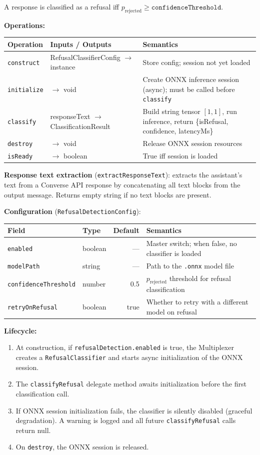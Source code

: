 \documentclass[10pt,letterpaper]{article}
\newcommand{\cls}[1]{\texttt{#1}}
\newcommand{\fn}[1]{\texttt{#1}}
\newcommand{\fld}[1]{\texttt{#1}}
\begin{document}
\medskip
\noindent A response is classified as a refusal iff $p_{\text{rejected}} \ge \fld{confidenceThreshold}$.

\medskip
\noindent\textbf{Operations:}

\smallskip
\begin{tabular}{@{}l l p{6.5cm}@{}}
\toprule
\textbf{Operation} & \textbf{Inputs / Outputs} & \textbf{Semantics} \\
\midrule
\fn{construct} & RefusalClassifierConfig $\to$ instance & Store config; session not yet loaded \\
\fn{initialize} & $\to$ void & Create ONNX inference session (async); must be called before \fn{classify} \\
\fn{classify} & responseText $\to$ ClassificationResult & Build string tensor $[1, 1]$, run inference, return \{isRefusal, confidence, latencyMs\} \\
\fn{destroy} & $\to$ void & Release ONNX session resources \\
\fn{isReady} & $\to$ boolean & True iff session is loaded \\
\bottomrule
\end{tabular}

\medskip
\noindent\textbf{Response text extraction} (\fn{extractResponseText}): extracts the assistant's text from a Converse API response by concatenating all text blocks from the output message. Returns empty string if no text blocks are present.

\medskip
\noindent\textbf{Configuration} (\cls{RefusalDetectionConfig}):

\smallskip
\begin{tabular}{@{}l l r p{5cm}@{}}
\toprule
\textbf{Field} & \textbf{Type} & \textbf{Default} & \textbf{Semantics} \\
\midrule
\fld{enabled} & boolean & --- & Master switch; when false, no classifier is loaded \\
\fld{modelPath} & string & --- & Path to the \texttt{.onnx} model file \\
\fld{confidenceThreshold} & number & 0.5 & $p_{\text{rejected}}$ threshold for refusal classification \\
\fld{retryOnRefusal} & boolean & true & Whether to retry with a different model on refusal \\
\bottomrule
\end{tabular}

\medskip
\noindent\textbf{Lifecycle:}
\begin{enumerate}[nosep]
  \item At construction, if \fld{refusalDetection.enabled} is true, the Multiplexer creates a \cls{RefusalClassifier} and starts async initialization of the ONNX session.
  \item The \fn{classifyRefusal} delegate method awaits initialization before the first classification call.
  \item If ONNX session initialization fails, the classifier is silently disabled (graceful degradation). A warning is logged and all future \fn{classifyRefusal} calls return null.
  \item On \fn{destroy}, the ONNX session is released.
\end{enumerate}
\end{document}
